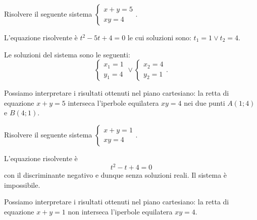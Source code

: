 \begin{esempio}
Risolvere il seguente sistema 
$\left\{\begin{array}{l}{x+y=5}\\{xy=4}\end{array}\right.$.
\begin{multicols}{2}
L'equazione risolvente è $t^2-5t+4=0$ le cui soluzioni sono: $t_1=1\vee t_2=4$.

Le soluzioni del sistema sono le seguenti: \[ 
\left\{\begin{array}{l}{x_1=1}\\{y_1=4}\end{array}\right.\vee 
\left\{\begin{array}{l}{x_2=4}\\{y_2=1}\end{array}\right.. \]

Possiamo interpretare i risultati ottenuti nel piano cartesiano: la retta di 
equazione $x+y=5$ interseca l'iperbole equilatera ${xy}=4$ nei due punti 
$A(1;4)$ e $B(4;1)$.
\begin{center}

\end{center}
\end{multicols}
\end{esempio}

\begin{esempio}
Risolvere il seguente sistema 
$\left\{\begin{array}{l}{x+y=1}\\{xy=4}\end{array}\right.$.
\begin{multicols}{2}
L'equazione risolvente è \[ t^2-t+4=0 \] con il discriminante negativo e dunque 
senza soluzioni reali. Il sistema è impossibile.

Possiamo interpretare i risultati ottenuti nel piano cartesiano: la retta di 
equazione $x+y=1$ non interseca l'iperbole equilatera ${xy}=4$.
\begin{center}

\end{center}
\end{multicols}
\end{esempio}


